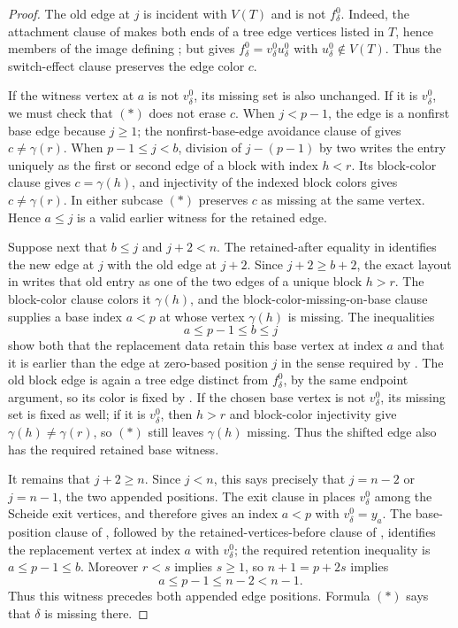 \begin{proof}
The old edge at $j$ is incident with $V(T)$ and is not
$f^0_\delta$.  Indeed, the attachment clause of 
makes both ends of a tree edge vertices listed in $T$, hence members of
the image defining ; but
 gives
$f^0_\delta=v^0_\delta u^0_\delta$ with
$u^0_\delta\notin V(T)$.  Thus the switch-effect clause preserves the
edge color $c$.

If the witness vertex at $a$ is not $v^0_\delta$, its missing set is also
unchanged.  If it is $v^0_\delta$, we must check that $(*)$ does not erase
$c$.  When $j<p-1$, the edge is a nonfirst base edge because $j\geq1$;
the nonfirst-base-edge avoidance clause of
 gives
$c\ne\gamma(r)$.  When $p-1\leq j<b$, division of
$j-(p-1)$ by two writes the entry uniquely as the first or second edge of
a block with index $h<r$.  Its block-color clause gives $c=\gamma(h)$,
and injectivity of the indexed block colors gives
$c\ne\gamma(r)$.  In either subcase $(*)$ preserves $c$ as missing at the
same vertex.  Hence $a\leq j$ is a valid earlier witness for the retained
edge.

Suppose next that $b\leq j$ and $j+2<n$.  The retained-after equality in
 identifies the new edge at $j$ with the
old edge at $j+2$.  Since $j+2\geq b+2$, the exact layout in
 writes that old entry as one of
the two edges of a unique block $h>r$.  The block-color clause colors it
$\gamma(h)$, and the block-color-missing-on-base clause supplies a base
index $a<p$ at whose vertex $\gamma(h)$ is missing.  The inequalities
\[
 a\leq p-1\leq b\leq j
\]
show both that the replacement data retain this base vertex at index $a$
and that it is earlier than the edge at zero-based position $j$ in the
sense required by .  The old block edge is again a
tree edge distinct from $f^0_\delta$, by the same endpoint argument, so
its color is fixed by .  If the
chosen base vertex is not $v^0_\delta$, its missing set is fixed as well;
if it is $v^0_\delta$, then $h>r$ and block-color injectivity give
$\gamma(h)\ne\gamma(r)$, so $(*)$ still leaves $\gamma(h)$ missing.
Thus the shifted edge also has the required retained base witness.

It remains that $j+2\geq n$.  Since $j<n$, this says precisely that
$j=n-2$ or $j=n-1$, the two appended positions.  The exit clause in
 places $v^0_\delta$ among the Scheide exit
vertices, and  therefore gives an
index $a<p$ with $v^0_\delta=y_a$.  The base-position clause of
, followed by the
retained-vertices-before clause of ,
identifies the replacement vertex at index $a$ with $v^0_\delta$; the
required retention inequality is $a\leq p-1\leq b$.  Moreover $r<s$
implies $s\geq1$, so $n+1=p+2s$ implies
\[
 a\leq p-1\leq n-2<n-1.
\]
Thus this witness precedes both appended edge positions.  Formula $(*)$
says that $\delta$ is missing there.


\end{proof}
